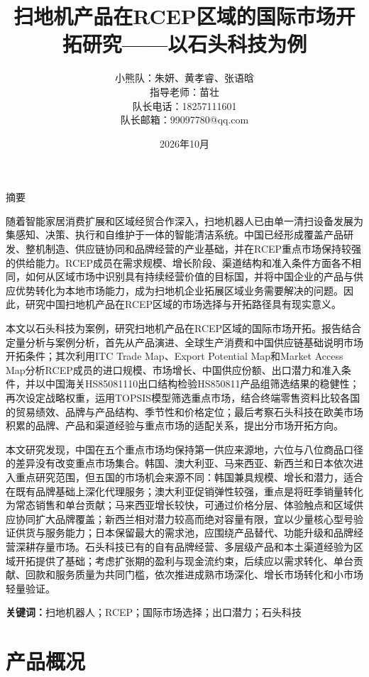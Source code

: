 \documentclass[UTF8,a4paper,12pt]{ctexart}
\title{扫地机产品在RCEP区域的国际市场开拓研究——以石头科技为例}
\author{
小熊队：朱妍、黄孝睿、张语晗\\
指导老师：苗壮\\
队长电话：18257111601\\
队长邮箱：99097780@qq.com}
\date{2026年10月}
\begin{document}
\maketitle
\clearpage

\begin{center}
{\heiti 摘\quad 要}
\end{center}

随着智能家居消费扩展和区域经贸合作深入，扫地机器人已由单一清扫设备发展为集感知、决策、执行和自维护于一体的智能清洁系统。中国已经形成覆盖产品研发、整机制造、供应链协同和品牌经营的产业基础，并在RCEP重点市场保持较强的供给能力。RCEP成员在需求规模、增长阶段、渠道结构和准入条件方面各不相同，如何从区域市场中识别具有持续经营价值的目标国，并将中国企业的产品与供应优势转化为本地市场能力，成为扫地机企业拓展区域业务需要解决的问题。因此，研究中国扫地机产品在RCEP区域的市场选择与开拓路径具有现实意义。

本文以石头科技为案例，研究扫地机产品在RCEP区域的国际市场开拓。报告结合定量分析与案例分析，首先从产品演进、全球生产消费和中国供应链基础说明市场开拓条件；其次利用ITC Trade Map、Export Potential Map和Market Access Map分析RCEP成员的进口规模、市场增长、中国供应份额、出口潜力和准入条件，并以中国海关HS85081110出口结构检验HS850811产品组筛选结果的稳健性；再次设定战略权重，运用TOPSIS模型筛选重点市场，结合终端零售资料比较各国的贸易绩效、品牌与产品结构、季节性和价格定位；最后考察石头科技在欧美市场积累的品牌、产品和渠道经验与重点市场的适配关系，提出分市场开拓方向。

本文研究发现，中国在五个重点市场均保持第一供应来源地，六位与八位商品口径的差异没有改变重点市场集合。韩国、澳大利亚、马来西亚、新西兰和日本依次进入重点研究范围，但五国的市场机会来源不同：韩国兼具规模、增长和潜力，适合在既有品牌基础上深化代理服务；澳大利亚促销弹性较强，重点是将旺季销量转化为常态销售和单台贡献；马来西亚增长较快，可通过价格分层、体验触点和区域供应协同扩大品牌覆盖；新西兰相对潜力较高而绝对容量有限，宜以少量核心型号验证供货与服务能力；日本保留最大的需求池，应围绕产品替代、功能升级和品牌经营深耕存量市场。石头科技已有的自有品牌经营、多层级产品和本土渠道经验为区域开拓提供了基础；考虑扩张期的盈利与现金流约束，后续应以需求转化、单台贡献、回款和服务质量为共同门槛，依次推进成熟市场深化、增长市场转化和小市场轻量验证。

\par\noindent\textbf{关键词：}扫地机器人；RCEP；国际市场选择；出口潜力；石头科技

\clearpage
\tableofcontents
\clearpage

\section{产品概况}
\end{document}
